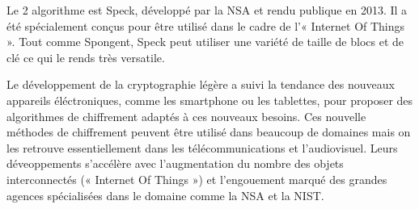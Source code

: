 Le 2 algorithme est Speck, développé par la NSA et rendu publique en 2013. Il a été spécialement conçus pour être utilisé dans le cadre de l'« Internet Of Things ».
Tout comme Spongent, Speck peut utiliser une variété de taille de blocs et de clé ce qui le rends très versatile.

Le développement de la cryptographie légère a suivi la tendance des nouveaux appareils éléctroniques, comme les smartphone ou les tablettes, pour proposer des algorithmes de chiffrement adaptés à ces nouveaux besoins.
Ces nouvelle méthodes de chiffrement peuvent être utilisé dans beaucoup de domaines mais on les retrouve essentiellement dans les télécommunications et l'audiovisuel.
Leurs déveoppements s'accélère avec l'augmentation du nombre des objets interconnectés (« Internet Of Things ») et l'engouement marqué des grandes agences spécialisées dans le domaine comme la NSA et la NIST.
